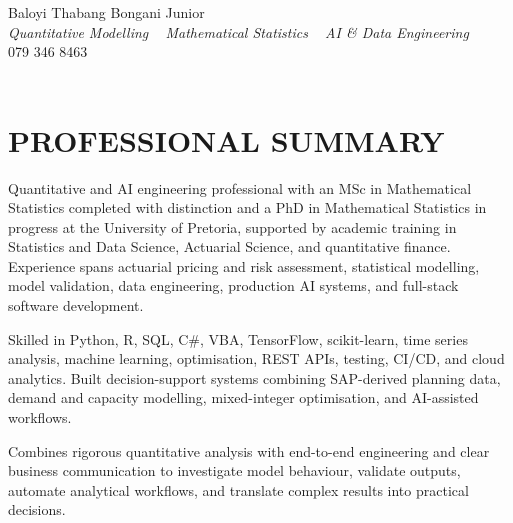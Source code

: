 \documentclass[letterpaper,11pt]{article}
\begin{document}


\begin{center}
    {\huge Baloyi Thabang Bongani Junior} \\ \vspace{2pt}
    {\large\textit{Quantitative Modelling \textbar~ Mathematical Statistics \textbar~ AI \& Data Engineering}} \\ \vspace{4pt}
    {079 346 8463} ~\textbar~
    \href{mailto:Baloyibongani1@gmail.com}{\color{blue}{Baloyibongani1@gmail.com}} \\ \vspace{1pt}
    \href{https://www.linkedin.com/in/thabang-bongani-junior-baloyi-2622b0286/}{\color{blue}{linkedin.com/in/thabang-bongani-junior-baloyi}} ~\textbar~
    \href{https://github.com/thabangTheActuaryCoder}{\color{blue}{github.com/thabangTheActuaryCoder}}
    \vspace{-7pt}
\end{center}

\section{PROFESSIONAL SUMMARY}
\vspace{4pt}
{\small
\noindent
Quantitative and AI engineering professional with an MSc in Mathematical Statistics completed
with distinction and a PhD in Mathematical Statistics in progress at the University of Pretoria, supported by academic training in Statistics and Data Science, Actuarial Science,
and quantitative finance. Experience spans actuarial pricing and risk assessment, statistical
modelling, model validation, data engineering, production AI systems, and full-stack software development.

\vspace{4pt}

\noindent
Skilled in Python, R, SQL, C\#, VBA, TensorFlow, scikit-learn, time series analysis,
machine learning, optimisation, REST APIs, testing, CI/CD, and cloud analytics. Built
decision-support systems combining SAP-derived planning data, demand and capacity modelling,
mixed-integer optimisation, and AI-assisted workflows.

\vspace{4pt}

\noindent
Combines rigorous quantitative analysis with end-to-end engineering and clear business
communication to investigate model behaviour, validate outputs, automate analytical workflows,
and translate complex results into practical decisions.
}
\vspace{-2pt}
\end{document}
